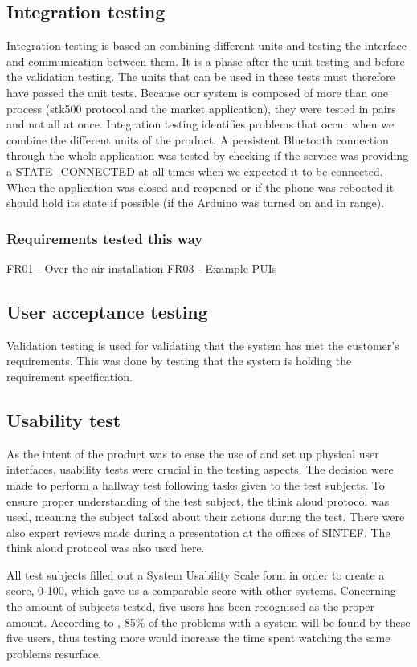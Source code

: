		\subsection{Integration testing}
			Integration testing is based on combining different units and testing the interface and communication between them. It is a phase after the unit testing and before the validation testing. The units that can be used in these tests must therefore have passed the unit tests. Because our system is composed of more than one process (stk500 protocol and the market application), they were tested in pairs and not all at once. Integration testing identifies problems that occur when we combine the different units of the product. A persistent Bluetooth connection through the whole application was tested by checking if the service was providing a STATE\_CONNECTED at all times when we expected it to be connected. When the application was closed and reopened or if the phone was rebooted it should hold its state if possible (if the Arduino was turned on and in range). 

			\subsubsection{Requirements tested this way}
			FR01 - Over the air installation
			FR03 - Example PUIs

		\subsection{User acceptance testing}
			Validation testing is used for validating that the system has met the customer's requirements. This was done by testing that the system is holding the requirement specification.


		\subsection{Usability test}
		As the intent of the product was to ease the use of and set up physical user interfaces, usability tests were crucial in the testing aspects. The decision were made to perform a hallway test following tasks given to the test subjects. To ensure proper understanding of the test subject, the think aloud protocol was used, meaning the subject talked about their actions during the test. There were also expert reviews made during a presentation at the offices of SINTEF. The think aloud protocol was also used here.

		All test subjects filled out a System Usability Scale form in order to create a score, 0-100, which gave us a comparable score with other systems. Concerning the amount of subjects tested, five users has been recognised as the proper amount. According to \cite{Nielsen}, 85\% of the problems with a system will be found by these five users, thus testing more would increase the time spent watching the same problems resurface.

